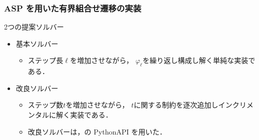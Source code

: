 \documentclass[dvipdfmx,11pt]{beamer}
\begin{document}
\begin{frame}\frametitle{ASP を用いた有界組合せ遷移の実装}
  
  \scalebox{0.9}{
    \centering
    
  }

  \bigskip

  \begin{alertblock}{2つの提案ソルバー}
    \begin{itemize}
      \item 基本ソルバー
            \begin{itemize}
              \item ステップ長$\ell$を増加させながら，
                    $\varphi_{\ell}$を繰り返し構成し解く単純な実装である．
            \end{itemize}
      \item 改良ソルバー
            \begin{itemize}
              \item ステップ数$t$を増加させながら，
                    $t$に関する制約を逐次追加しインクリメンタルに解く実装である．
              \item 改良ソルバーは，{\clingo}の PythonAPI を用いた．
            \end{itemize}
    \end{itemize}    
  \end{alertblock}

\end{frame}
\end{document}
